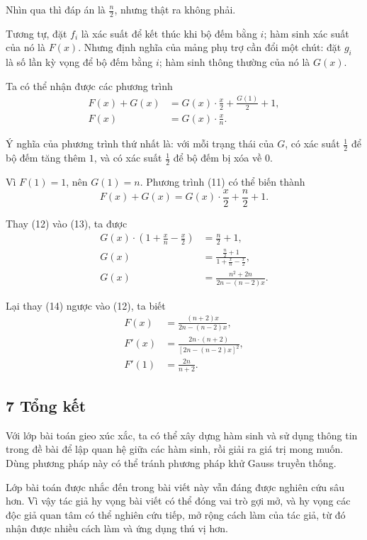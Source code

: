 \documentclass[11pt]{article}
\begin{document}
Nhìn qua thì đáp án là \(\frac{n}{2}\), nhưng thật ra không phải.

Tương tự, đặt \(f_i\) là xác suất để kết thúc khi bộ đếm bằng \(i\); hàm sinh
xác suất của nó là \(F(x)\). Nhưng định nghĩa của mảng phụ trợ cần đổi một
chút: đặt \(g_i\) là số lần kỳ vọng để bộ đếm bằng \(i\); hàm sinh thông thường
của nó là \(G(x)\).

Ta có thể nhận được các phương trình
\begin{align}
  F(x)+G(x)&=G(x)\cdot\frac{x}{2}+\frac{G(1)}{2}+1, \tag{11}\\
  F(x)&=G(x)\cdot\frac{x}{n}. \tag{12}
\end{align}

Ý nghĩa của phương trình thứ nhất là: với mỗi trạng thái của \(G\), có xác suất
\(\frac{1}{2}\) để bộ đếm tăng thêm \(1\), và có xác suất \(\frac{1}{2}\) để bộ
đếm bị xóa về \(0\).

Vì \(F(1)=1\), nên \(G(1)=n\). Phương trình (11) có thể biến thành
\[
  F(x)+G(x)=G(x)\cdot\frac{x}{2}+\frac{n}{2}+1. \tag{13}
\]

Thay (12) vào (13), ta được
\begin{align}
  G(x)\cdot\left(1+\frac{x}{n}-\frac{x}{2}\right)&=\frac{n}{2}+1,\\
  G(x)&=\frac{\frac{n}{2}+1}{1+\frac{x}{n}-\frac{x}{2}},\\
  G(x)&=\frac{n^2+2n}{2n-(n-2)x}. \tag{14}
\end{align}

Lại thay (14) ngược vào (12), ta biết
\begin{align}
  F(x)&=\frac{(n+2)x}{2n-(n-2)x},\\
  F'(x)&=\frac{2n\cdot(n+2)}{[2n-(n-2)x]^2},\\
  F'(1)&=\frac{2n}{n+2}.
\end{align}

\subsection*{7 Tổng kết}

Với lớp bài toán gieo xúc xắc, ta có thể xây dựng hàm sinh và sử dụng thông tin
trong đề bài để lập quan hệ giữa các hàm sinh, rồi giải ra giá trị mong muốn.
Dùng phương pháp này có thể tránh phương pháp khử Gauss truyền thống.

Lớp bài toán được nhắc đến trong bài viết này vẫn đáng được nghiên cứu sâu hơn.
Vì vậy tác giả hy vọng bài viết có thể đóng vai trò gợi mở, và hy vọng các độc
giả quan tâm có thể nghiên cứu tiếp, mở rộng cách làm của tác giả, từ đó nhận
được nhiều cách làm và ứng dụng thú vị hơn.
\end{document}
